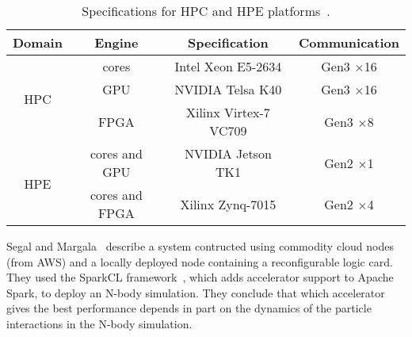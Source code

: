 \begin{table}[ht]
\centering
\caption{Specifications for HPC and HPE platforms~\protect\cite{rpm+15}.}
\label{tbl:hpchpe}
\vspace{0.1in}
\begin{tabular}{c | c | c | c}
Domain & Engine & Specification & Communication \\ \hline
\multirow{3}{*}{HPC} & cores & Intel Xeon E5-2634 & Gen3 $\times$16 \\
 & GPU & NVIDIA Telsa K40 & Gen3 $\times$16 \\ 
 & FPGA & Xilinx Virtex-7 VC709 & Gen3 $\times$8 \\ \hline
\multirow{2}{*}{HPE} & cores and GPU & NVIDIA Jetson TK1 & Gen2 $\times$1 \\
 & cores and FPGA & Xilinx Zynq-7015 & Gen2 $\times$4
\end{tabular}
\end{table}


Segal and Margala~\cite{sm16} describe a system contructed using commodity cloud
nodes (from AWS) and a locally deployed node containing a reconfigurable logic
card.  They used the SparkCL framework~\cite{sparkcl}, which adds accelerator
support to Apache Spark, to deploy an N-body simulation. They conclude that
which accelerator gives the best performance depends in part on the dynamics
of the particle interactions in the N-body simulation.
